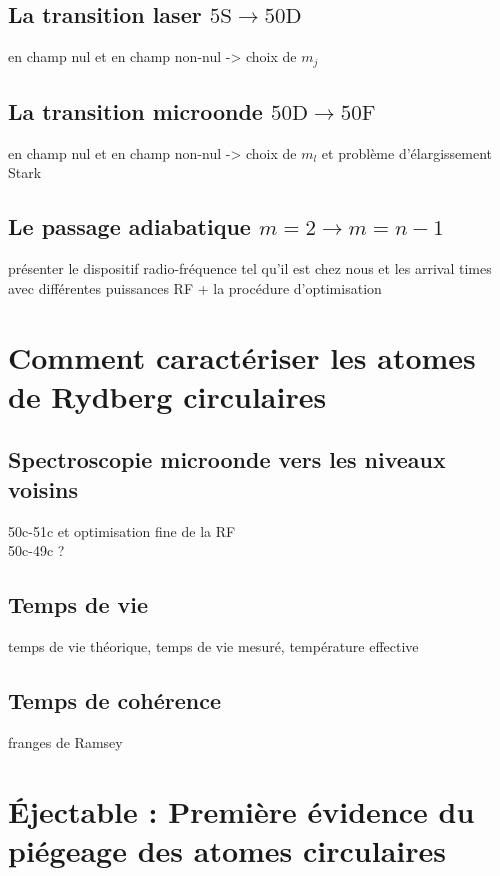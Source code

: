 	\subsection{La transition laser $\mathrm{5S \rightarrow 50D}$}
		\noindent en champ nul et en champ non-nul -> choix de $m_j$
	\subsection{La transition microonde $\mathrm{50D \rightarrow 50F}$}
		\noindent en champ nul et en champ non-nul -> choix de $m_l$ et problème d'élargissement Stark
	\subsection{Le passage adiabatique $m=2\rightarrow m=n-1$}
		\noindent présenter le dispositif radio-fréquence tel qu'il est chez nous
		et les arrival times avec différentes puissances RF + la procédure d'optimisation

\section{Comment caractériser les atomes de Rydberg circulaires}
	\subsection{Spectroscopie microonde vers les niveaux voisins}
		\noindent 50c-51c et optimisation fine de la RF\\
		\noindent 50c-49c ?
	\subsection{Temps de vie}
		\noindent temps de vie théorique, temps de vie mesuré, température effective
	\subsection{Temps de cohérence}
		\noindent franges de Ramsey
	


\section{Éjectable : Première évidence du piégeage des atomes circulaires}
